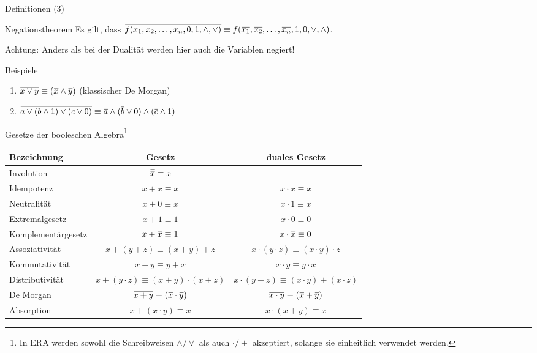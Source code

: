 \begin{frame}[c, fragile]{Definitionen (3)}{}
	\begin{block}{Negationstheorem}
		Es gilt, dass $\mkern1mu\overline{\mkern-1muf(x_1, x_2, \ldots, x_n, 0, 1, \wedge, \vee)} \equiv f(\mkern1mu\overline{\mkern-1mux_1}, \mkern1mu\overline{\mkern-1mux_2}, \ldots, \mkern1mu\overline{\mkern-1mux_n}, 1, 0, \vee, \wedge)$.

		Achtung: Anders als bei der Dualität werden hier auch die Variablen negiert!
	\end{block}
	\vfill{}
	\begin{block}{Beispiele}
		\begin{enumerate}
			\item $\mkern1mu\overline{\mkern-1mux\vee y} \equiv (\mkern1mu\overline{\mkern-1mux} \wedge \mkern1mu\overline{\mkern-1muy})$ (klassischer De Morgan)
			\item $\mkern1mu\overline{\mkern-1mua \vee (b\wedge 1) \vee (c \vee 0)} \equiv \mkern1mu\overline{\mkern-1mua} \wedge (\mkern1mu\overline{\mkern-1mub}\vee 0) \wedge (\mkern1mu\overline{\mkern-1muc} \wedge 1)$
		\end{enumerate}
	\end{block}
\end{frame}

\begin{frame}[c, fragile]{Gesetze der booleschen Algebra\footnote{In ERA werden sowohl die Schreibweisen $\wedge/\vee$ als auch $\cdot / +$ akzeptiert, solange sie einheitlich verwendet werden.}}{}
	\begin{center}
		\begin{tabular}{lcc}
			Bezeichnung        & Gesetz                                & duales Gesetz                              \\\hline
			Involution         & $\n{\n{x}}\equiv x$                   & --                                         \\
			Idempotenz         & $x+x\equiv x$                         & $x\cdot x\equiv x$                         \\
			Neutralität        & $x+0\equiv x$                         & $x\cdot 1\equiv x$                         \\
			Extremalgesetz     & $x+1\equiv 1$                         & $x\cdot 0\equiv 0$                         \\
			Komplementärgesetz & $x+\mkern1mu\overline{\mkern-1mux}\equiv 1$                     & $x\cdot\mkern1mu\overline{\mkern-1mux}\equiv 0$                      \\\pause
			Assoziativität     & $x + (y+z)\equiv (x + y)+z$           & $x\cdot(y\cdot z)\equiv (x\cdot y)\cdot z$ \\
			Kommutativität     & $x + y\equiv y+x$                     & $x\cdot y\equiv y\cdot x$                  \\
			Distributivität    & $x+(y\cdot z)\equiv (x+y)\cdot (x+z)$ & $x\cdot(y+z)\equiv (x\cdot y)+ (x\cdot z)$ \\
			De Morgan          & $\mkern1mu\overline{\mkern-1mux+ y} \equiv (\mkern1mu\overline{\mkern-1mux} \cdot \mkern1mu\overline{\mkern-1muy})$ & $\mkern1mu\overline{\mkern-1mux\cdot y} \equiv (\mkern1mu\overline{\mkern-1mux} + \mkern1mu\overline{\mkern-1muy})$      \\
			Absorption         & $x + (x\cdot y) \equiv x$             & $x \cdot (x+y) \equiv x$                   \\
		\end{tabular}
	\end{center}
\end{frame}

